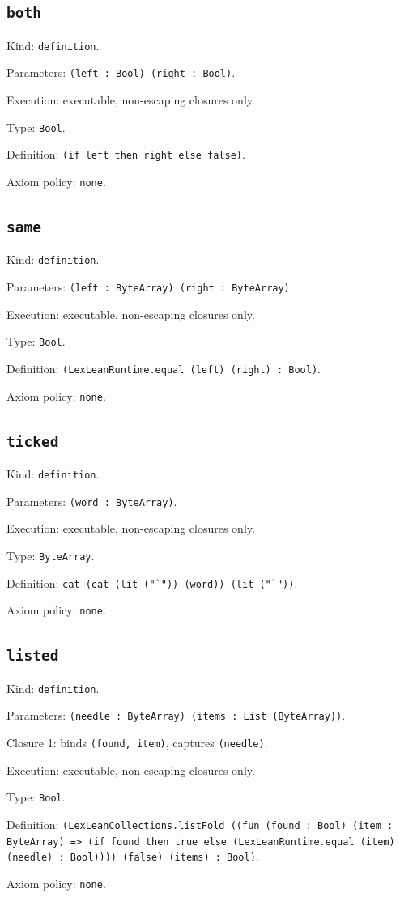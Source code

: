 \documentclass[11pt]{article}
\begin{document}
\subsection*{\texttt{both}}
\noindent Kind: \texttt{definition}.\par
\noindent Parameters: \texttt{(left : Bool) (right : Bool)}.\par
\noindent Execution: executable, non-escaping closures only.\par
\noindent Type: \texttt{Bool}.\par
\noindent Definition: \texttt{(if left then right else false)}.\par
\noindent Axiom policy: \texttt{none}.\par
\subsection*{\texttt{same}}
\noindent Kind: \texttt{definition}.\par
\noindent Parameters: \texttt{(left : ByteArray) (right : ByteArray)}.\par
\noindent Execution: executable, non-escaping closures only.\par
\noindent Type: \texttt{Bool}.\par
\noindent Definition: \texttt{(LexLeanRuntime.equal (left) (right) : Bool)}.\par
\noindent Axiom policy: \texttt{none}.\par
\subsection*{\texttt{ticked}}
\noindent Kind: \texttt{definition}.\par
\noindent Parameters: \texttt{(word : ByteArray)}.\par
\noindent Execution: executable, non-escaping closures only.\par
\noindent Type: \texttt{ByteArray}.\par
\noindent Definition: \texttt{cat (cat (lit ("`")) (word)) (lit ("`"))}.\par
\noindent Axiom policy: \texttt{none}.\par
\subsection*{\texttt{listed}}
\noindent Kind: \texttt{definition}.\par
\noindent Parameters: \texttt{(needle : ByteArray) (items : List (ByteArray))}.\par
\noindent Closure 1: binds \texttt{(found, item)}, captures \texttt{(needle)}.\par
\noindent Execution: executable, non-escaping closures only.\par
\noindent Type: \texttt{Bool}.\par
\noindent Definition: \texttt{(LexLeanCollections.listFold ((fun (found : Bool) (item : ByteArray) => (if found then true else (LexLeanRuntime.equal (item) (needle) : Bool)))) (false) (items) : Bool)}.\par
\noindent Axiom policy: \texttt{none}.\par
\end{document}

